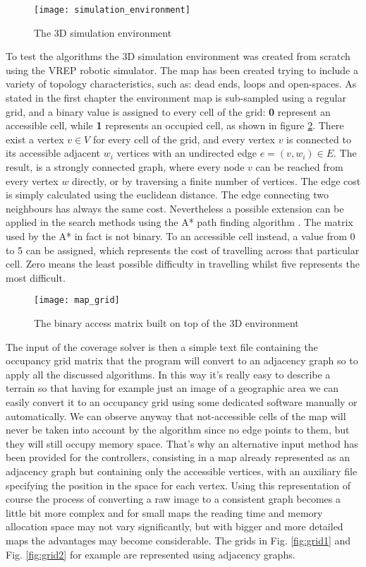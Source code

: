 \begin{figure}[H]
\centering
\texttt{[image: simulation\_environment]}
\caption{The 3D simulation environment}
\label{fig:simEnv}
\end{figure}


To test the algorithms the 3D simulation environment was created from scratch using the VREP robotic simulator. The map has been created trying to include a variety of topology characteristics, such as: dead ends, loops and open-spaces.
As stated in the first chapter the environment map is sub-sampled using a regular grid, and a binary value is assigned to every cell of the grid: \textbf{0} represent an accessible cell, while \textbf{1} represents an occupied cell, as shown in figure \ref{fig:mapGrid}.  There exist a vertex $v \in V$ for every cell of the grid, and every vertex $v$ is connected to its accessible adjacent $w_i$ vertices with an undirected edge $e=(v,w_i) \in E$. The result, is a strongly connected graph, where every node $v$ can be reached from every vertex $w$ directly, or by traversing a finite number of vertices. The edge cost is simply calculated using the euclidean distance. The edge connecting two neighbours has always the same cost. Nevertheless a possible extension can be applied in the search methods using the A* path finding algorithm \cite{4082128}. The matrix used by the A* in fact is not binary. To an accessible cell instead, a value from 0 to 5 can be assigned, which represents the cost of travelling across that particular cell. Zero means the least possible difficulty in travelling whilst five represents the most difficult.


\begin{figure}[H]
\centering
\texttt{[image: map\_grid]}
\caption{The binary access matrix built on top of the 3D environment}
\label{fig:mapGrid}
\end{figure}

The input of the coverage solver is then a simple text file containing the occupancy grid matrix that the program will convert to an adjacency graph so to apply all the discussed algorithms. In this way it's really easy to describe a terrain so that having for example just an image of a geographic area we can easily convert it to an occupancy grid using some dedicated software manually or automatically. We can observe anyway that not-accessible cells of the map will never be taken into account by the algorithm since no edge points to them, but they will still occupy memory space. That's why an alternative input method has been provided for the controllers, consisting in a map already represented as an adjacency graph but containing only the accessible vertices, with an auxiliary file specifying the position in the space for each vertex. Using this representation of course the process of converting a raw image to a consistent graph becomes a little bit more complex and for small maps the reading time and memory allocation space may not vary significantly, but with bigger and more detailed maps the advantages may become considerable. The grids in Fig.  \ref{fig:grid1} and Fig. \ref{fig:grid2} for example are represented using adjacency graphs.


